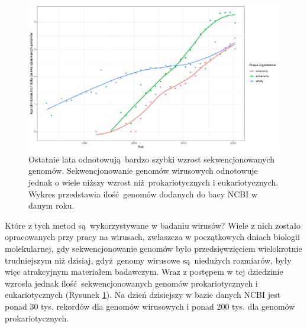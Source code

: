 \documentclass[two column, twoside, a4paper]{article}
\begin{document}
\begin{figure}
\begin{tcolorbox}
	\centering
	\includegraphics[width=\textwidth]{./sequenced_genomes.pdf}
	\caption{Ostatnie lata odnotowują bardzo szybki wzrost sekwencjonowanych genomów. Sekwencjonowanie genomów wirusowych odnotowuje jednak o wiele niższy wzrost niż prokariotycznych i eukariotycznych. Wykres przedstawia ilość genomów dodanych do bacy NCBI \autocite{NCBI} w danym roku.}\label{fig::seq_trends}

\end{tcolorbox}
\end{figure}

Które z tych metod są wykorzystywane w badaniu wirusów? Wiele z nich zostało opracowanych przy pracy na wirusach, zwłaszcza w początkowych dniach biologii molekularnej, gdy sekwencjonowanie genomów było przedsięwzięciem wielokrotnie trudniejszym niż dzisiaj, gdyż genomy wirusowe są niedużych rozmiarów, były więc atrakcyjnym materiałem badawczym. Wraz z postępem w tej dziedzinie wzrosła jednak ilość sekwencjonowanych genomów prokariotycznych i eukariotycznych (Rysunek \ref{fig::seq_trends}). Na dzień dzisiejszy w bazie danych NCBI jest ponad 30 tys. rekordów dla genomów wirusowych i ponad 200 tys. dla genomów prokariotycznych.

\printbibliography
\end{document}
